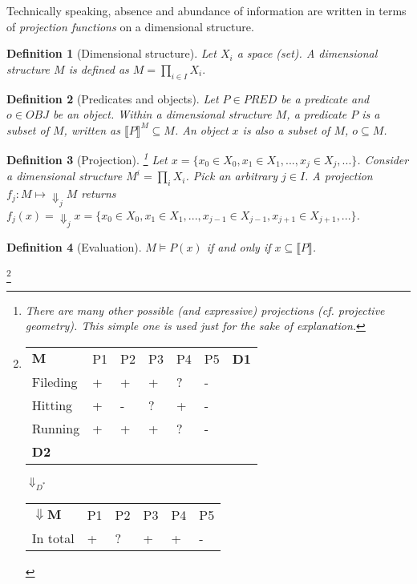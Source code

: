 \documentclass{tufte-handout}
\newtheorem{definition}{Definition}
\begin{document}
Technically speaking, absence and abundance of information are written in terms of \emph{projection functions} on a dimensional structure.

\begin{definition}[Dimensional structure]
Let $X_i$ a space (set).
A dimensional structure $M$ is defined as
$M = \prod_{i \in I} X_i.$
\end{definition}

\begin{definition}[Predicates and objects]
Let $P \in PRED$ be a predicate and $o \in OBJ$ be an object.
Within a dimensional structure $M$,
a predicate $P$ is a subset of $M$, written as $\llbracket P \rrbracket^{M} \subseteq M$. An object $x$ is also a subset of $M$, $o \subseteq M$.
\end{definition}

\begin{definition}[Projection]
\footnote{There are many other possible (and expressive) projections (cf. projective geometry). This simple one is used just for  the sake of explanation. }
Let $x = \{x_0 \in X_0, x_1 \in X_1, ... , x_j \in X_j, ...\}$.
Consider a dimensional structure $M^{i} = \prod_i X_i$.
Pick an arbitrary $j \in I$.
A projection $f_j: M \mapsto \Downarrow_j M$ returns $f_{j}(x)= \Downarrow_{j}x = \{x_0 \in X_0, x_1 \in X_1, ... , x_{j-1} \in X_{j-1}, x_{j+1} \in X_{j+1}, ...\}$.
\end{definition}

\begin{definition}[Evaluation]
$M \models P(x)$ if and only if $x \subseteq \llbracket P \rrbracket$.
\end{definition}

\footnote{
\begin{tabular}{lllllll}
$\mathbf{M}$        & P1 & P2 & P3 & P4 & P5 & \textbf{D1}  \\
Fileding & +  & +  & +  & ?  & -  &     \\
Hitting  & +  & -  & ?  & +  & -  &     \\
Running  & +  & +  & +  & ?  & -  &     \\
\textbf{D2}       &    &    &    &    &    &
\end{tabular}

\vspace{2mm}
\hspace{4mm}
{\Large $\Downarrow_{D^*}$}
\vspace{2mm}

\begin{tabular}{llllll}
$\Downarrow \mathbf{M}$ & P1 & P2 & P3 & P4 & P5  \\
In  total                  & +  & ?  & +  & +  & -
\end{tabular}
}
\end{document}
